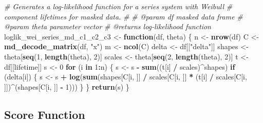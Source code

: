 \documentclass[
]{article}
\newenvironment{Shaded}{\begin{snugshade}}{\end{snugshade}}
\newcommand{\CommentTok}[1]{\textcolor[rgb]{0.56,0.35,0.01}{\textit{#1}}}
\newcommand{\ControlFlowTok}[1]{\textcolor[rgb]{0.13,0.29,0.53}{\textbf{#1}}}
\newcommand{\DecValTok}[1]{\textcolor[rgb]{0.00,0.00,0.81}{#1}}
\newcommand{\KeywordTok}[1]{\textcolor[rgb]{0.13,0.29,0.53}{\textbf{#1}}}
\newcommand{\NormalTok}[1]{#1}
\newcommand{\OperatorTok}[1]{\textcolor[rgb]{0.81,0.36,0.00}{\textbf{#1}}}
\newcommand{\StringTok}[1]{\textcolor[rgb]{0.31,0.60,0.02}{#1}}
\theoremstyle{definition}
\theoremstyle{plain}
\theoremstyle{definition}
\theoremstyle{definition}
\theoremstyle{definition}
\theoremstyle{definition}
\theoremstyle{remark}
\begin{document}
\begin{Shaded}
\begin{Highlighting}[]
\CommentTok{\#\textquotesingle{} Generates a log{-}likelihood function for a series system with Weibull}
\CommentTok{\#\textquotesingle{} component lifetimes for masked data.}
\CommentTok{\#\textquotesingle{}}
\CommentTok{\#\textquotesingle{} @param df masked data frame}
\CommentTok{\#\textquotesingle{} @param theta parameter vector}
\CommentTok{\#\textquotesingle{} @returns log{-}likelihood function}
\NormalTok{loglik\_wei\_series\_md\_c1\_c2\_c3 \textless{}{-}}\StringTok{ }\ControlFlowTok{function}\NormalTok{(df, theta) \{}
\NormalTok{  n \textless{}{-}}\StringTok{ }\KeywordTok{nrow}\NormalTok{(df)}
\NormalTok{  C \textless{}{-}}\StringTok{ }\KeywordTok{md\_decode\_matrix}\NormalTok{(df, }\StringTok{"x"}\NormalTok{)}
\NormalTok{  m \textless{}{-}}\StringTok{ }\KeywordTok{ncol}\NormalTok{(C)}
\NormalTok{  delta \textless{}{-}}\StringTok{ }\NormalTok{df[[}\StringTok{"delta"}\NormalTok{]]}
\NormalTok{  shapes \textless{}{-}}\StringTok{ }\NormalTok{theta[}\KeywordTok{seq}\NormalTok{(}\DecValTok{1}\NormalTok{, }\KeywordTok{length}\NormalTok{(theta), }\DecValTok{2}\NormalTok{)]}
\NormalTok{  scales \textless{}{-}}\StringTok{ }\NormalTok{theta[}\KeywordTok{seq}\NormalTok{(}\DecValTok{2}\NormalTok{, }\KeywordTok{length}\NormalTok{(theta), }\DecValTok{2}\NormalTok{)]}
\NormalTok{  t \textless{}{-}}\StringTok{ }\NormalTok{df[[lifetime]]}
\NormalTok{  s \textless{}{-}}\StringTok{ }\DecValTok{0}
  \ControlFlowTok{for}\NormalTok{ (i }\ControlFlowTok{in} \DecValTok{1}\OperatorTok{:}\NormalTok{n) \{}
\NormalTok{    s \textless{}{-}}\StringTok{ }\NormalTok{s }\OperatorTok{{-}}\StringTok{ }\KeywordTok{sum}\NormalTok{((t[i] }\OperatorTok{/}\StringTok{ }\NormalTok{scales)}\OperatorTok{\^{}}\NormalTok{shapes)}
    \ControlFlowTok{if}\NormalTok{ (delta[i]) \{}
\NormalTok{      s \textless{}{-}}\StringTok{ }\NormalTok{s }\OperatorTok{+}\StringTok{ }\KeywordTok{log}\NormalTok{(}\KeywordTok{sum}\NormalTok{(shapes[C[i, ]] }\OperatorTok{/}\StringTok{ }\NormalTok{scales[C[i, ]] }\OperatorTok{*}
\StringTok{        }\NormalTok{(t[i] }\OperatorTok{/}\StringTok{ }\NormalTok{scales[C[i, ]])}\OperatorTok{\^{}}\NormalTok{(shapes[C[i, ]] }\OperatorTok{{-}}\StringTok{ }\DecValTok{1}\NormalTok{)))}
\NormalTok{    \}}
\NormalTok{  \}}
  \KeywordTok{return}\NormalTok{(s)}
\NormalTok{\}}
\end{Highlighting}
\end{Shaded}

\hypertarget{app-score-fn-r}{%
\subsection{Score Function}\label{app-score-fn-r}}
\end{document}
